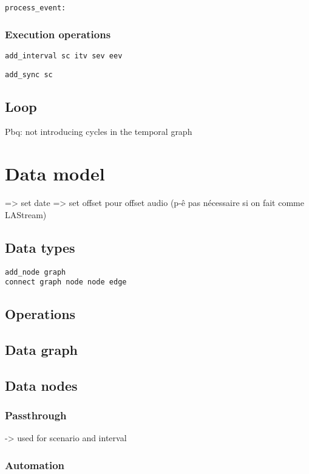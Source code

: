 \documentclass[applsci,article,submit,moreauthors,pdftex,10pt,a4paper]{mdpi}
\begin{document}
\begin{lstlisting}
process_event:
\end{lstlisting}

\subsubsection{Execution operations}
\begin{lstlisting}
add_interval sc itv sev eev
\end{lstlisting}
\begin{lstlisting}
add_sync sc
\end{lstlisting}


\subsection{Loop}
Pbq: not introducing cycles in the temporal graph
\section{Data model}
=> set date
=> set offset pour offset audio (p-ê pas nécessaire si on fait comme LAStream)

\subsection{Data types}

\begin{lstlisting}
add_node graph 
connect graph node node edge
\end{lstlisting}
\subsection{Operations}
\subsection{Data graph}
\subsection{Data nodes}
\subsubsection{Passthrough}
-> used for scenario and interval

\subsubsection{Automation}
\end{document}
